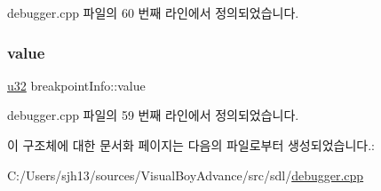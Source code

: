 debugger.\+cpp 파일의 60 번째 라인에서 정의되었습니다.

\mbox{\label{structbreakpoint_info_a10cf821e6c0c5b11b921baafa0144448}} 
\subsubsection{\texorpdfstring{value}{value}}
{\footnotesize\ttfamily \mbox{\hyperlink{_system_8h_a10e94b422ef0c20dcdec20d31a1f5049}{u32}} breakpoint\+Info\+::value}



debugger.\+cpp 파일의 59 번째 라인에서 정의되었습니다.



이 구조체에 대한 문서화 페이지는 다음의 파일로부터 생성되었습니다.\+:\begin{DoxyCompactItemize}
\item 
C\+:/\+Users/sjh13/sources/\+Visual\+Boy\+Advance/src/sdl/\mbox{\hyperlink{debugger_8cpp}{debugger.\+cpp}}\end{DoxyCompactItemize}
